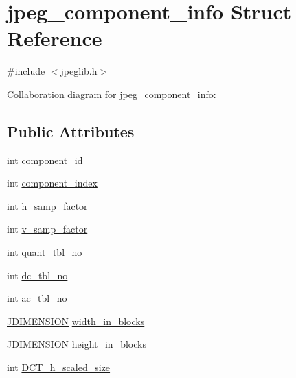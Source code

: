 \hypertarget{structjpeg__component__info}{}\section{jpeg\+\_\+component\+\_\+info Struct Reference}
\label{structjpeg__component__info}


{\ttfamily \#include $<$jpeglib.\+h$>$}



Collaboration diagram for jpeg\+\_\+component\+\_\+info\+:
\subsection*{Public Attributes}
\begin{DoxyCompactItemize}
\item 
int \mbox{\hyperlink{structjpeg__component__info_a205782ff7ec47c58cb470f121247ea8d}{component\+\_\+id}}
\item 
int \mbox{\hyperlink{structjpeg__component__info_aa29b9e1c664a9b0b8a1c3069ad167817}{component\+\_\+index}}
\item 
int \mbox{\hyperlink{structjpeg__component__info_a3a8e122fa2eee3c7bede586d371fe202}{h\+\_\+samp\+\_\+factor}}
\item 
int \mbox{\hyperlink{structjpeg__component__info_a83b263da2a749a8fe96be728889af0df}{v\+\_\+samp\+\_\+factor}}
\item 
int \mbox{\hyperlink{structjpeg__component__info_a0a9d70b6a95d3ca58a34a7ea8bfefbf8}{quant\+\_\+tbl\+\_\+no}}
\item 
int \mbox{\hyperlink{structjpeg__component__info_a304fa583caa0601abc7077a218988854}{dc\+\_\+tbl\+\_\+no}}
\item 
int \mbox{\hyperlink{structjpeg__component__info_adfea67573a39b232c3d82ac808539a83}{ac\+\_\+tbl\+\_\+no}}
\item 
\mbox{\hyperlink{jmorecfg_8h_a04ed4674f6f1d0d50ec241531e38274f}{J\+D\+I\+M\+E\+N\+S\+I\+ON}} \mbox{\hyperlink{structjpeg__component__info_a059454e8192effeabc6eab34e2ad198d}{width\+\_\+in\+\_\+blocks}}
\item 
\mbox{\hyperlink{jmorecfg_8h_a04ed4674f6f1d0d50ec241531e38274f}{J\+D\+I\+M\+E\+N\+S\+I\+ON}} \mbox{\hyperlink{structjpeg__component__info_a3f9218e7590c328bfd88d900f58886f4}{height\+\_\+in\+\_\+blocks}}
\item 
int \mbox{\hyperlink{structjpeg__component__info_a54dc0e1df56d88d3257fef0abfd9fea0}{D\+C\+T\+\_\+h\+\_\+scaled\+\_\+size}}
\item 

\end{DoxyCompactItemize}
